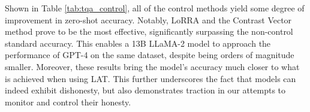 Shown in Table \ref{tab:tqa_control}, all of the control methods yield some degree of improvement in zero-shot accuracy. Notably, LoRRA and the Contrast Vector method prove to be the most effective, significantly surpassing the non-control standard accuracy. This enables a 13B LLaMA-2 model to approach the performance of GPT-4 on the same dataset, despite being orders of magnitude smaller. Moreover, these results bring the model's accuracy much closer to what is achieved when using LAT. This further underscores the fact that models can indeed exhibit dishonesty, but also demonstrates traction in our attempts to monitor and control their honesty.
